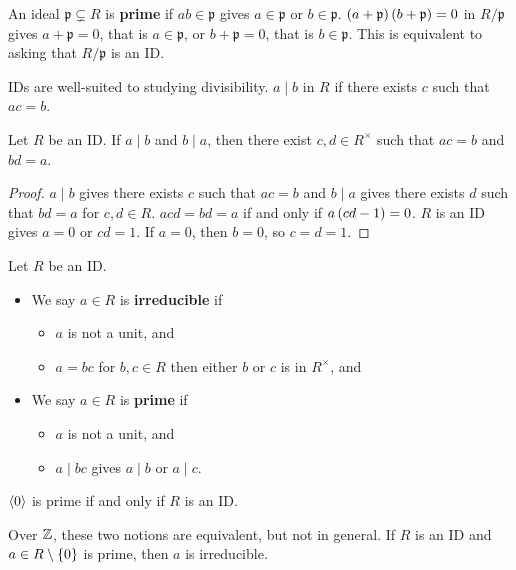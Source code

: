 \begin{remark1}
An ideal $ \mathfrak{p} \subsetneq R $ is \textbf{prime} if $ ab \in \mathfrak{p} $ gives $ a \in \mathfrak{p} $ or $ b \in \mathfrak{p} $. $ \left( a + \mathfrak{p} \right)\left( b + \mathfrak{p} \right) = 0 $ in $ R / \mathfrak{p} $ gives $ a + \mathfrak{p} = 0 $, that is $ a \in \mathfrak{p} $, or $ b + \mathfrak{p} = 0 $, that is $ b \in \mathfrak{p} $. This is equivalent to asking that $ R / \mathfrak{p} $ is an ID.
\end{remark1}

IDs are well-suited to studying divisibility. $ a \mid b $ in $ R $ if there exists $ c $ such that $ ac = b $.

\begin{lemma}
Let $ R $ be an ID. If $ a \mid b $ and $ b \mid a $, then there exist $ c, d \in R^\times $ such that $ ac = b $ and $ bd = a $.
\end{lemma}

\begin{proof}
$ a \mid b $ gives there exists $ c $ such that $ ac = b $ and $ b \mid a $ gives there exists $ d $ such that $ bd = a $ for $ c, d \in R $. $ acd = bd = a $ if and only if $ a\left( cd - 1 \right) = 0 $. $ R $ is an ID gives $ a = 0 $ or $ cd = 1 $. If $ a = 0 $, then $ b = 0 $, so $ c = d = 1 $.
\end{proof}

\begin{definition}
Let $ R $ be an ID.
\begin{itemize}
\item We say $ a \in R $ is \textbf{irreducible} if
\begin{itemize}
\item $ a $ is not a unit, and
\item $ a = bc $ for $ b, c \in R $ then either $ b $ or $ c $ is in $ R^\times $, and
\end{itemize}
\item We say $ a \in R $ is \textbf{prime} if
\begin{itemize}
\item $ a $ is not a unit, and
\item $ a \mid bc $ gives $ a \mid b $ or $ a \mid c $.
\end{itemize}
\end{itemize}
\end{definition}

$ \left\langle 0 \right\rangle $ is prime if and only if $ R $ is an ID.

\begin{remark1}
Over $ \mathbb{Z} $, these two notions are equivalent, but not in general. If $ R $ is an ID and $ a \in R \setminus \left\{ 0 \right\} $ is prime, then $ a $ is irreducible.
\end{remark1}

